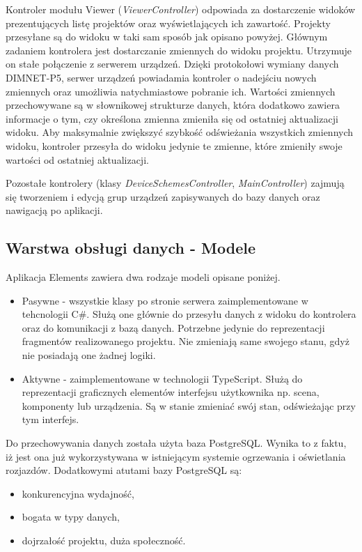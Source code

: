 Kontroler modułu Viewer (\textit{ViewerController}) odpowiada za dostarczenie widoków prezentujących listę projektów oraz wyświetlających ich zawartość. Projekty przesyłane są do widoku w taki sam sposób jak opisano powyżej. Głównym zadaniem kontrolera jest dostarczanie zmiennych do widoku projektu. Utrzymuje on stałe połączenie z serwerem urządzeń. Dzięki protokołowi wymiany danych DIMNET-P5, serwer urządzeń powiadamia kontroler o nadejściu nowych zmiennych oraz umożliwia natychmiastowe pobranie ich. Wartości zmiennych przechowywane są w słownikowej strukturze danych, która dodatkowo zawiera informacje o tym, czy określona zmienna zmieniła się od ostatniej aktualizacji widoku. Aby maksymalnie zwiększyć szybkość odświeżania wszystkich zmiennych widoku, kontroler przesyła do widoku jedynie te zmienne, które zmieniły swoje wartości od ostatniej aktualizacji.

Pozostałe kontrolery (klasy \textit{DeviceSchemesController}, \textit{MainController}) zajmują się tworzeniem i edycją grup urządzeń zapisywanych do bazy danych oraz nawigacją po aplikacji.

\subsection{Warstwa obsługi danych - Modele}
Aplikacja Elements zawiera dwa rodzaje modeli opisane poniżej.
\begin{itemize}
\item Pasywne - wszystkie klasy po stronie serwera zaimplementowane w tehcnologii C\#. Służą one głównie do przesyłu danych z widoku do kontrolera oraz do komunikacji z bazą danych. Potrzebne jedynie do reprezentacji fragmentów realizowanego projektu. Nie zmieniają same swojego stanu, gdyż nie posiadają one żadnej logiki. 
\item Aktywne - zaimplementowane w technologii TypeScript. Służą do reprezentacji graficznych elementów interfejsu użytkownika np. scena, komponenty lub urządzenia. Są w stanie zmieniać swój stan, odświeżając przy tym interfejs.
\end{itemize}

Do przechowywania danych została użyta baza PostgreSQL. Wynika to z faktu, iż jest ona już wykorzystywana w istniejącym systemie ogrzewania i oświetlania rozjazdów. Dodatkowymi atutami bazy PostgreSQL są: \cite{postgresql-book}
\begin{itemize}
\item konkurencyjna wydajność,
\item bogata w typy danych,
\item dojrzałość projektu, duża społeczność.
\end{itemize}

